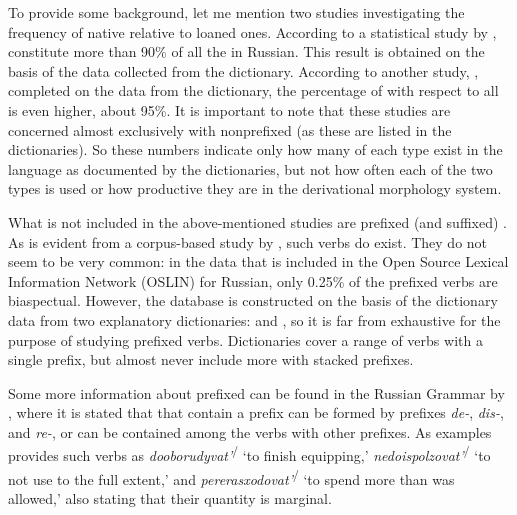 To provide some background, let me mention two studies investigating the frequency of native  relative to loaned ones. According to a statistical study by \citet{Certkova:98},  constitute more than 90\% of all the  in Russian. This result is obtained on the basis of the data collected from the \citet{Ozegov:90} dictionary. According to another study, \citet{Anderson:02}, completed on the data from the \citet{Zaliznjak:77} dictionary, the percentage of  with respect to all  is even higher, about 95\%. It is important to note that these studies are concerned almost exclusively with nonprefixed  (as these are listed in the dictionaries). So these numbers indicate only how many  of each type exist in the language as documented by the dictionaries, but not how often each of the two types is used or how productive they are in the derivational morphology system.

What is not included in the above-mentioned studies are prefixed (and suffixed) . As is evident from a corpus-based study by \citet{Borik:12}, such verbs do exist. They do not seem to be very common: in the data that is included in the Open Source Lexical Information Network (OSLIN) for Russian, only 0.25\% of the prefixed verbs are biaspectual. However, the database is constructed on the basis of the dictionary data from two explanatory dictionaries: \citet{Ushakov:50} and \citet{OzegovShvedova:92}, so it is far from exhaustive for the purpose of studying prefixed verbs. Dictionaries cover a range of verbs with a single prefix, but almost never include more  with stacked prefixes. 

Some more information about prefixed   can be found in the Russian Grammar by \citet{Shvedova:82}, where it is stated that  that contain a prefix can be formed by  prefixes \textit {de-}, \textit {dis-}, and \textit{re-}, or can be contained among the verbs with other prefixes. As examples \citet{Shvedova:82} provides such verbs as  \textit{dooborudyvat'}\textsuperscript{\IPF\slash\PF} `to finish equipping,' \textit{nedoispolzovat'}\textsuperscript{\IPF\slash\PF} `to not use to the full extent,' and \textit{pererasxodovat'}\textsuperscript{\IPF\slash\PF} `to spend more than was allowed,' also stating that their quantity is marginal. 

